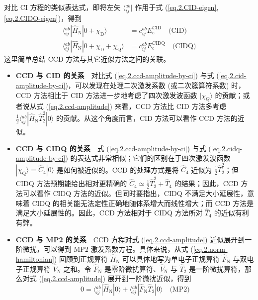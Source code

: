对比 CI 方程的类似表达式，即将左矢 $\langle {}_{ij}^{ab} |$ 作用于式 (\ref{eq.2.CID-eigen}, \ref{eq.2.CIDQ-eigen})，得到
\begin{align}
  \label{eq.2.cid-amplitude-by-ci}
  \langle {}_{ij}^{ab} | \hat H_\mathrm{N} | 0 + \chi_\mathrm{D} \rangle &= c_{ij}^{ab} E_\mathrm{c}^\mathrm{CID} \quad \text{(CID)} \\
  \label{eq.2.cidq-amplitude-by-ci}
  \langle {}_{ij}^{ab} | \hat H_\mathrm{N} | 0 + \chi_\mathrm{D} + \chi_\mathrm{Q} \rangle &= c_{ij}^{ab} E_\mathrm{c}^\mathrm{CIDQ} \quad \text{(CIDQ)}
\end{align}
这里简单总结 CCD 方法与其它近似方法之间的关联。
\begin{itemize}[nosep]
  \item \textbf{CCD 与 CID 的关系}　对比式 (\ref{eq.2.ccd-amplitude-by-ci}) 与式 (\ref{eq.2.cid-amplitude-by-ci})，可以发现在处理二次激发系数 (或二次簇算符系数) 时，CCD 方法相比于 CID 方法进一步地考虑了四次激发波函数 $| \chi_Q \rangle$ 的贡献；或者说从式 (\ref{eq.2.ccd-amplitude}) 来看，CCD 方法比 CID 方法多考虑 $\frac{1}{2} \langle {}_{ij}^{ab} | \hat H_\mathrm{N} \hat T_2^2 | 0 \rangle$ 的贡献。从这个角度而言，CID 方法可以看作 CCD 方法的近似。
  \item \textbf{CCD 与 CIDQ 的关系}　式 (\ref{eq.2.ccd-amplitude-by-ci}) 与式 (\ref{eq.2.cidq-amplitude-by-ci}) 的表达式非常相似；它们的区别在于四次激发波函数 $| \chi_\mathrm{Q} \rangle = \hat C_4 | 0 \rangle$ 是如何被近似的。CCD 的处理方式是将 $\hat C_4$ 近似为 $\frac{1}{2} \hat T_2^2$；但 CIDQ 方法预期能给出相对更精确的 $\hat C_4 \simeq \frac{1}{2} \hat T_2^2 + \hat T_4$ 的结果；因此，CCD 方法可以看作 CIDQ 方法的近似。但同时要指出，CIDQ 不满足大小延展性，意味着 CIDQ 的相关能无法定性正确地随体系增大而线性增大；而 CCD 方法是满足大小延展性的。因此，CCD 方法相对于 CIDQ 方法所对 $\hat T_4$ 的近似有利有弊。
  \item \textbf{CCD 与 MP2 的关系}　CCD 方程对式 (\ref{eq.2.ccd-amplitude}) 近似展开到一阶微扰，可以得到 MP2 激发系数方程。具体来说，从式 (\ref{eq.2.norm-hamiltonian}) 回顾到正规算符 $\hat H_\mathrm{N}$ 可以具体地写为单电子正规算符 $\hat F_\mathrm{N}$ 与双电子正规算符 $\hat V_\mathrm{N}$ 之和。令 $\hat F_\mathrm{N}$ 是零阶微扰算符、$\hat V_\mathrm{N}$ 与 $\hat T_2$ 是一阶微扰算符，那么对式 (\ref{eq.2.ccd-amplitude}) 展开到一阶微扰近似，得到
  \begin{equation}
    \label{eq.2.mp2-amplitude}
    0 = \langle {}_{ij}^{ab} | \hat H_\mathrm{N} | 0 \rangle + \langle {}_{ij}^{ab} | \hat F_\mathrm{N} \hat T_2 | 0 \rangle \quad \text{(MP2)}
  \end{equation}

\end{itemize}
